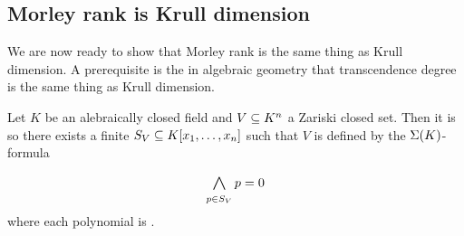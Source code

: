 \subsection{Morley rank is Krull dimension}
We are now ready to show that Morley rank is the same thing as Krull dimension.
A prerequisite is the  
in algebraic geometry that transcendence degree 
is the same thing as Krull dimension.

\begin{rmk}
    Let $K$ be an alebraically closed field and $V \subseteq K^n$ 
    a Zariski closed set. 
    Then it is  
    so there exists a finite $S_V \subseteq K[x_1,\dots,x_n]$ such that 
    $V$ is defined by the $\Sigma(K)$-formula 
    \[\bigand{p \in S_V}{} p = 0\]
    where each polynomial is 
    .
\end{rmk}

